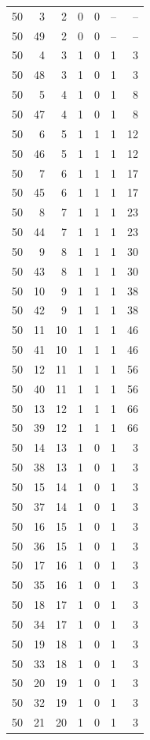 \begin{longtable}{rrrrrrr}
50 & 3 & 2 & 0 & 0 & -- & --\\
50 & 49 & 2 & 0 & 0 & -- & --\\
50 & 4 & 3 & 1 & 0 & 1 & 3\\
50 & 48 & 3 & 1 & 0 & 1 & 3\\
50 & 5 & 4 & 1 & 0 & 1 & 8\\
50 & 47 & 4 & 1 & 0 & 1 & 8\\
50 & 6 & 5 & 1 & 1 & 1 & 12\\
50 & 46 & 5 & 1 & 1 & 1 & 12\\
50 & 7 & 6 & 1 & 1 & 1 & 17\\
50 & 45 & 6 & 1 & 1 & 1 & 17\\
50 & 8 & 7 & 1 & 1 & 1 & 23\\
50 & 44 & 7 & 1 & 1 & 1 & 23\\
50 & 9 & 8 & 1 & 1 & 1 & 30\\
50 & 43 & 8 & 1 & 1 & 1 & 30\\
50 & 10 & 9 & 1 & 1 & 1 & 38\\
50 & 42 & 9 & 1 & 1 & 1 & 38\\
50 & 11 & 10 & 1 & 1 & 1 & 46\\
50 & 41 & 10 & 1 & 1 & 1 & 46\\
50 & 12 & 11 & 1 & 1 & 1 & 56\\
50 & 40 & 11 & 1 & 1 & 1 & 56\\
50 & 13 & 12 & 1 & 1 & 1 & 66\\
50 & 39 & 12 & 1 & 1 & 1 & 66\\
50 & 14 & 13 & 1 & 0 & 1 & 3\\
50 & 38 & 13 & 1 & 0 & 1 & 3\\
50 & 15 & 14 & 1 & 0 & 1 & 3\\
50 & 37 & 14 & 1 & 0 & 1 & 3\\
50 & 16 & 15 & 1 & 0 & 1 & 3\\
50 & 36 & 15 & 1 & 0 & 1 & 3\\
50 & 17 & 16 & 1 & 0 & 1 & 3\\
50 & 35 & 16 & 1 & 0 & 1 & 3\\
50 & 18 & 17 & 1 & 0 & 1 & 3\\
50 & 34 & 17 & 1 & 0 & 1 & 3\\
50 & 19 & 18 & 1 & 0 & 1 & 3\\
50 & 33 & 18 & 1 & 0 & 1 & 3\\
50 & 20 & 19 & 1 & 0 & 1 & 3\\
50 & 32 & 19 & 1 & 0 & 1 & 3\\
50 & 21 & 20 & 1 & 0 & 1 & 3\\

\end{longtable}
